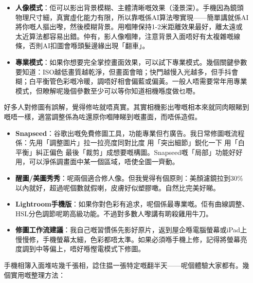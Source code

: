 
\begin{itemize}
  \item \textbf{人像模式}：佢可以影出背景模糊、主體清晰嘅效果（淺景深）。手機因為鏡頭物理尺寸細，真實虛化能力有限，所以靠嘅係AI算法嚟實現——簡單講就係AI將你嘅人摳出嚟，然後模糊背景。用嗰陣保持1-2米距離效果最好，離太遠或太近算法都容易出錯。仲有，影人像嗰陣，注意背景入面唔好有太複雜嘅線條，否則AI扣圖會喺頭髮邊緣出現「翻車」。
  \item \textbf{專業模式}：如果你想要完全掌控畫面效果，可以試下專業模式。幾個關鍵參數要知道：ISO越低畫質越乾淨，但畫面會暗；快門越慢入光越多，但手抖會糊；白平衡管色彩嘅冷暖，調唔好相會偏藍或偏黃。一般人唔需要常年用專業模式，但瞭解呢幾個參數至少可以等你知道相機喺度做乜嘢。
\end{itemize}


好多人對修圖有誤解，覺得修咗就唔真實。其實相機影出嚟嘅相本來就同肉眼睇到嘅唔一樣，適當調整係為咗還原你嗰陣睇到嘅畫面，而唔係造假。

\begin{itemize}
  \item \textbf{Snapseed}：谷歌出嘅免費修圖工具，功能專業但冇廣告。我日常修圖嘅流程係：先用「調整圖片」拉一拉亮度同對比度 用「突出細節」鋭化一下 用「白平衡」糾正偏色 最後「裁剪」成想要嘅構圖。Snapseed嘅「局部」功能好好用，可以淨係調畫面中某一個區域，唔使全圖一齊動。
  \item \textbf{醒圖/美圖秀秀}：呢兩個適合修人像。但我覺得有個原則：美顏濾鏡拉到30\%以內就好，超過呢個數就假喇，皮膚好似塑膠噉。自然比完美好睇。
  \item \textbf{Lightroom手機版}：如果你對色彩有追求，呢個係最專業嘅。佢有曲線調整、HSL分色調節呢啲高級功能。不過對多數人嚟講有啲殺雞用牛刀。
  \item \textbf{修圖工作流建議}：我自己嘅習慣係先影好原片，返到屋企喺電腦螢幕或iPad上慢慢修，手機螢幕太細，色彩都唔太準。如果必須喺手機上修，記得將螢幕亮度調到中等偏上，唔好喺慳電模式下修圖。
\end{itemize}


手機相簿入面堆咗幾千張相，諗住揾一張特定嘅翻半天——呢個體驗大家都有。幾個實用嘅整理方法：

